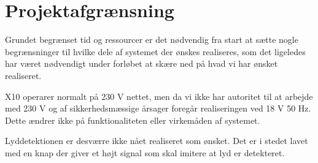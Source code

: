 \chapter{Projektafgrænsning}

Grundet begrænset tid og ressourcer er det nødvendig fra start at sætte nogle begrænsninger til hvilke dele af systemet der ønskes realiseres, som det ligeledes har været nødvendigt under forløbet at skære ned på hvad vi har ønsket realiseret. 

X10 operarer normalt på 230 V nettet, men da vi ikke har autoritet til at arbejde med 230 V og af sikkerhedsmæssige årsager foregår realiseringen ved 18 V 50 Hz. Dette ændrer ikke på funktionaliteten eller virkemåden af systemet. 

Lyddetektionen er desværre ikke nået realiseret som ønsket. Det er i stedet lavet med en knap der giver et højt signal som skal imitere at lyd er detekteret. 

